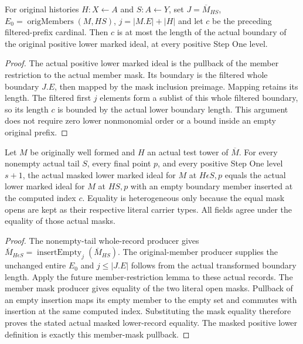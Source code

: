 \begin{definition}
\label{hir:original-interior-actual-positive-lower-index}
\leanok
{}
For original histories $H:X\leftarrow A$ and $S:A\leftarrow Y$, set
$J=\overline M_{HS}$, $E_0=\operatorname{origMembers}(M,HS)$,
$j=|M.E|+|H|$ and let $c$ be the preceding filtered-prefix cardinal.
Then $c$ is at most the length of the actual boundary of the original
positive lower marked ideal, at every positive Step One level.
\end{definition}
\begin{proof}
The actual positive lower marked ideal is the pullback of the member
restriction to the actual member mask.  Its boundary is the filtered whole
boundary $J.E$, then mapped by the mask inclusion preimage.  Mapping retains
its length.  The filtered first $j$ elements form a sublist of this whole
filtered boundary, so its length $c$ is bounded by the actual lower boundary
length.  This argument does not require zero lower nonmonomial order or a
bound inside an empty original prefix.
\end{proof}

\begin{theorem}
\label{hir:original-interior-actual-positive-lower-record}
\leanok
{}
Let $M$ be originally well formed and $H$ an actual test tower of
$\overline M$.  For every nonempty actual tail $S$, every final point $p$,
and every positive Step One level $s+1$, the actual masked lower marked
ideal for $M$ at $H\epsilon S,p$ equals the actual lower marked ideal for
$M$ at $HS,p$ with an empty boundary member inserted at the computed
index $c$.  Equality is heterogeneous only because the equal mask opens
are kept as their respective literal carrier types.  All fields agree
under the equality of those actual masks.
\end{theorem}
\begin{proof}
The nonempty-tail whole-record producer gives
$\overline M_{H\epsilon S}=\operatorname{insertEmpty}_j(\overline M_{HS})$.
The original-member producer supplies the unchanged entire $E_0$ and
$j\leq|J.E|$ follows from the actual transformed boundary length.
Apply the future member-restriction lemma to these actual records.  The
member mask producer gives equality of the two literal open masks.
Pullback of an empty insertion maps its empty member to the empty set and
commutes with insertion at the same computed index.  Substituting the mask
equality therefore proves the stated actual masked lower-record equality.
The masked positive lower definition is exactly this member-mask pullback.
\end{proof}

